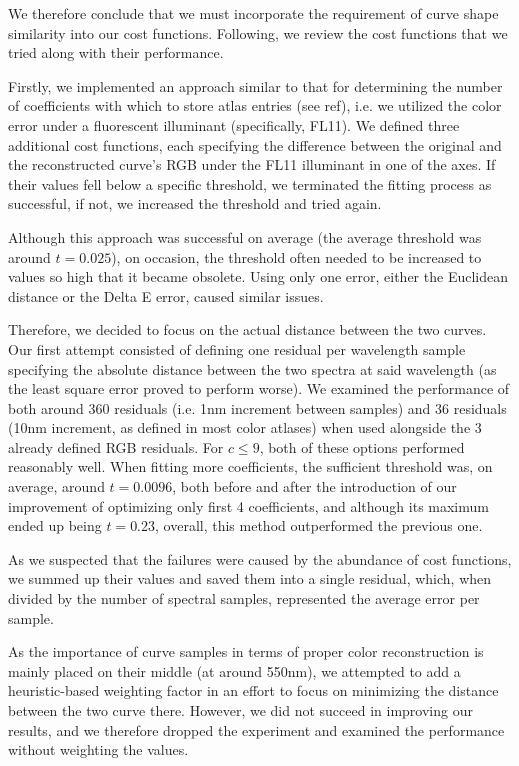 We therefore conclude that we must incorporate the requirement of curve shape similarity into our cost functions. Following, we review the cost functions that we tried along with their performance.

Firstly, we implemented an approach similar to that for determining the number of coefficients with which to store atlas entries (see ref), i.e. we utilized the color error under a fluorescent illuminant (specifically, FL11). We defined three additional cost functions, each specifying the difference between the original and the reconstructed curve's RGB under the FL11 illuminant in one of the axes. If their values fell below a specific threshold, we terminated the fitting process as successful, if not, we increased the threshold and tried again.

Although this approach was successful on average (the average threshold was around $t = 0.025$), on occasion, the threshold often needed to be increased to values so high that it became obsolete. Using only one error, either the Euclidean distance or the Delta E error, caused similar issues.

Therefore, we decided to focus on the actual distance between the two curves. Our first attempt consisted of defining one residual per wavelength sample specifying the absolute distance between the two spectra at said wavelength (as the least square error proved to perform worse). We examined the performance of both around 360 residuals (i.e. 1nm increment between samples) and 36 residuals (10nm increment, as defined in most color atlases) when used alongside the 3 already defined RGB residuals. For $c \le 9$, both of these options performed reasonably well. When fitting more coefficients, the sufficient threshold was, on average, around $t = 0.0096$, both before and after the introduction of our improvement of optimizing only first 4 coefficients, and although its maximum ended up being $t = 0.23$, overall, this method outperformed the previous one.

As we suspected that the failures were caused by the abundance of cost functions, we summed up their values and saved them into a single residual, which, when divided by the number of spectral samples, represented the average error per sample.

As the importance of curve samples in terms of proper color reconstruction is mainly placed on their middle (at around 550nm), we attempted to add a heuristic-based weighting factor in an effort to focus on minimizing the distance between the two curve there. However, we did not succeed in improving our results, and we therefore dropped the experiment and examined the performance without weighting the values.


